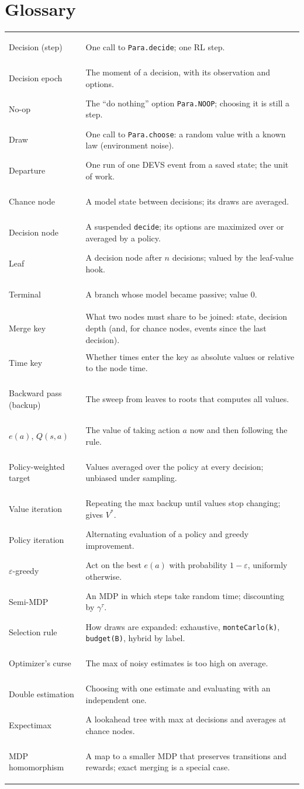 \documentclass[11pt]{article}
\newcommand{\code}[1]{\texttt{#1}}
\theoremstyle{plain}
\begin{document}
\section{Glossary}\label{app:glossary}
\begin{tabularx}{\linewidth}{@{}>{\bfseries\raggedright\arraybackslash}p{3.6cm}Y@{}}
\toprule
Decision (step) & One call to \code{Para.decide}; one RL step.\\
Decision epoch & The moment of a decision, with its observation and options.\\
No-op & The ``do nothing'' option \code{Para.NOOP}; choosing it is still a step.\\
Draw & One call to \code{Para.choose}: a random value with a known law (environment noise).\\
Departure & One run of one DEVS event from a saved state; the unit of work.\\
Chance node & A model state between decisions; its draws are averaged.\\
Decision node & A suspended \code{decide}; its options are maximized over or averaged by a policy.\\
Leaf & A decision node after $n$ decisions; valued by the leaf-value hook.\\
Terminal & A branch whose model became passive; value 0.\\
Merge key & What two nodes must share to be joined: state, decision depth (and, for chance nodes, events since the
  last decision).\\
Time key & Whether times enter the key as absolute values or relative to the node time.\\
Backward pass (backup) & The sweep from leaves to roots that computes all values.\\
$e(a)$, $Q(s,a)$ & The value of taking action $a$ now and then following the rule.\\
Policy-weighted target & Values averaged over the policy at every decision; unbiased under sampling.\\
Value iteration & Repeating the max backup until values stop changing; gives $V^*$.\\
Policy iteration & Alternating evaluation of a policy and greedy improvement.\\
$\varepsilon$-greedy & Act on the best $e(a)$ with probability $1-\varepsilon$, uniformly otherwise.\\
Semi-MDP & An MDP in which steps take random time; discounting by $\gamma^{\tau}$.\\
Selection rule & How draws are expanded: exhaustive, \code{monteCarlo(k)}, \code{budget(B)}, hybrid by label.\\
Optimizer's curse & The max of noisy estimates is too high on average.\\
Double estimation & Choosing with one estimate and evaluating with an independent one.\\
Expectimax & A lookahead tree with max at decisions and averages at chance nodes.\\
MDP homomorphism & A map to a smaller MDP that preserves transitions and rewards; exact merging is a special case.\\
\bottomrule
\end{tabularx}
\end{document}
